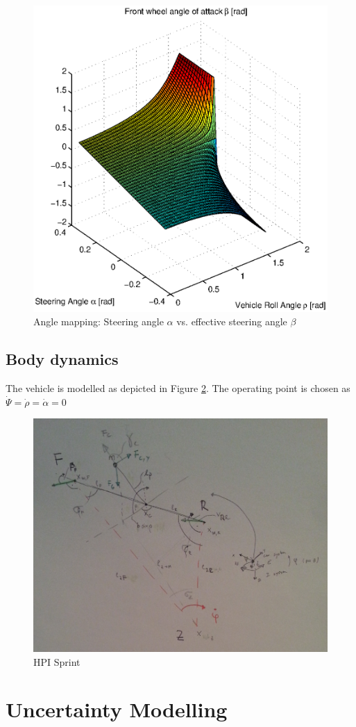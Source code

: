 \documentclass[conference]{IEEEtran}
\begin{document}
\begin{figure}[Hhh]
\centering
  \includegraphics[width=.4\textwidth]{pics/angle_plot.eps} 
  \caption{Angle mapping: Steering angle $\alpha$ vs. effective steering angle $\beta$}  
  \label{figure:angle_plot}
\end{figure}


\subsection{Body dynamics}

The vehicle is modelled as depicted in Figure \ref{figure:geometry}. The operating point is chosen as $\dot{\Psi} = \dot{\rho} = \dot{\alpha} = 0$

\begin{figure}[h!]
\centering
  \includegraphics[width=.47\textwidth]{pics/geometry} 
  \caption{HPI Sprint}  
  \label{figure:geometry}
\end{figure}





 







 
\section{Uncertainty Modelling}
\end{document}
